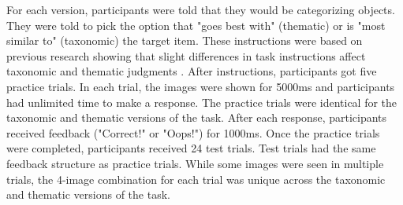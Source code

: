 \documentclass[../dissertation.tex]{subfiles}
\begin{document}
For each version, participants were told that they would be categorizing objects. They were told to pick the option that "goes best with" (thematic) or is "most similar to" (taxonomic) the target item. These instructions were based on previous research showing that slight differences in task instructions affect taxonomic and thematic judgments \citep{Lin2001}. After instructions, participants got five practice trials. In each trial, the images were shown for 5000ms and participants had unlimited time to make a response. The practice trials were identical for the taxonomic and thematic versions of the task. After each response, participants received feedback ("Correct!" or "Oops!") for 1000ms. Once the practice trials were completed, participants received 24 test trials. Test trials had the same feedback structure as practice trials. While some images were seen in multiple trials, the 4-image combination for each trial was unique across the taxonomic and thematic versions of the task.
\end{document}
